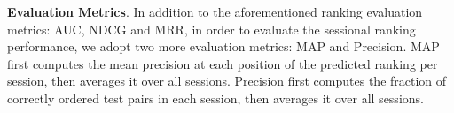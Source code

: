\documentclass[letterpaper]{article} %
\newcommand{\Rating}{\mathbf{X}}
\begin{document}
\textbf{Evaluation Metrics}.  In addition to the aforementioned  ranking evaluation metrics: AUC, NDCG and MRR, in order to evaluate the sessional ranking performance, we adopt two more evaluation metrics: MAP and Precision. MAP first computes the mean precision at each position of the predicted ranking per session, then averages it over all sessions. Precision first computes the fraction of correctly ordered test pairs in each session, then averages it over all sessions. %
\end{document}

